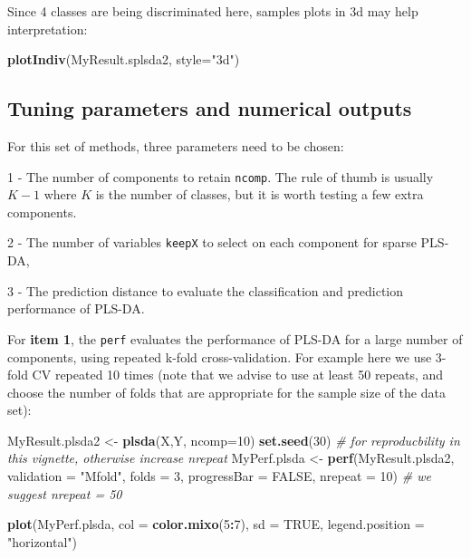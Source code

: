 \documentclass[]{book}
\newenvironment{Shaded}{\begin{snugshade}}{\end{snugshade}}
\newcommand{\CommentTok}[1]{\textcolor[rgb]{0.56,0.35,0.01}{\textit{#1}}}
\newcommand{\DataTypeTok}[1]{\textcolor[rgb]{0.13,0.29,0.53}{#1}}
\newcommand{\DecValTok}[1]{\textcolor[rgb]{0.00,0.00,0.81}{#1}}
\newcommand{\KeywordTok}[1]{\textcolor[rgb]{0.13,0.29,0.53}{\textbf{#1}}}
\newcommand{\NormalTok}[1]{#1}
\newcommand{\OperatorTok}[1]{\textcolor[rgb]{0.81,0.36,0.00}{\textbf{#1}}}
\newcommand{\OtherTok}[1]{\textcolor[rgb]{0.56,0.35,0.01}{#1}}
\newcommand{\StringTok}[1]{\textcolor[rgb]{0.31,0.60,0.02}{#1}}
\begin{document}
Since 4 classes are being discriminated here, samples plots in 3d may help interpretation:

\begin{Shaded}
\begin{Highlighting}[]
\KeywordTok{plotIndiv}\NormalTok{(MyResult.splsda2, }\DataTypeTok{style=}\StringTok{"3d"}\NormalTok{)}
\end{Highlighting}
\end{Shaded}

\hypertarget{tuning:sPLSDA}{%
\subsection{Tuning parameters and numerical outputs}\label{tuning:sPLSDA}}

For this set of methods, three parameters need to be chosen:

1 - The number of components to retain \texttt{ncomp}. The rule of thumb is usually \(K - 1\) where \(K\) is the number of classes, but it is worth testing a few extra components.

2 - The number of variables \texttt{keepX} to select on each component for sparse PLS-DA,

3 - The prediction distance to evaluate the classification and prediction performance of PLS-DA.

For \textbf{item 1}, the \texttt{perf} evaluates the performance of PLS-DA for a large number of components, using repeated k-fold cross-validation. For example here we use 3-fold CV repeated 10 times (note that we advise to use at least 50 repeats, and choose the number of folds that are appropriate for the sample size of the data set):

\begin{Shaded}
\begin{Highlighting}[]
\NormalTok{MyResult.plsda2 <-}\StringTok{ }\KeywordTok{plsda}\NormalTok{(X,Y, }\DataTypeTok{ncomp=}\DecValTok{10}\NormalTok{)}
\KeywordTok{set.seed}\NormalTok{(}\DecValTok{30}\NormalTok{) }\CommentTok{# for reproducbility in this vignette, otherwise increase nrepeat}
\NormalTok{MyPerf.plsda <-}\StringTok{ }\KeywordTok{perf}\NormalTok{(MyResult.plsda2, }\DataTypeTok{validation =} \StringTok{"Mfold"}\NormalTok{, }\DataTypeTok{folds =} \DecValTok{3}\NormalTok{, }
                  \DataTypeTok{progressBar =} \OtherTok{FALSE}\NormalTok{, }\DataTypeTok{nrepeat =} \DecValTok{10}\NormalTok{) }\CommentTok{# we suggest nrepeat = 50}

\KeywordTok{plot}\NormalTok{(MyPerf.plsda, }\DataTypeTok{col =} \KeywordTok{color.mixo}\NormalTok{(}\DecValTok{5}\OperatorTok{:}\DecValTok{7}\NormalTok{), }\DataTypeTok{sd =} \OtherTok{TRUE}\NormalTok{, }\DataTypeTok{legend.position =} \StringTok{"horizontal"}\NormalTok{)}
\end{Highlighting}
\end{Shaded}
\end{document}
